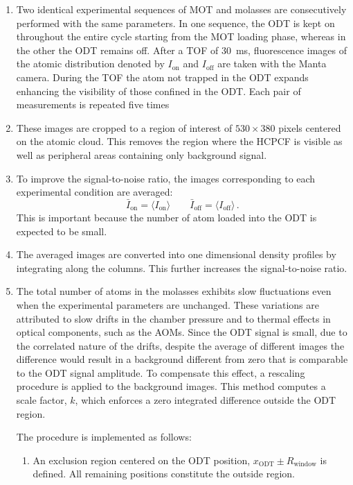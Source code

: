 \begin{enumerate}
    \item Two identical experimental sequences of MOT and molasses are consecutively performed with the same parameters. In one sequence, the ODT is kept on throughout the entire cycle starting from the MOT loading phase, whereas in the other the ODT remains off. After a TOF of 30~ms, fluorescence images of the atomic distribution denoted by $I_\text{on}$ and $I_\text{off}$ are taken with the Manta camera.
    During the TOF the atom not trapped in the ODT expands enhancing the visibility of those confined in the ODT. Each pair of measurements is repeated five times
    
    \item  These images are cropped to  a region of interest of $530 \times 380$ pixels centered on the atomic cloud. This removes the region where the HCPCF is visible as well as peripheral areas containing only background signal.
    
    \item To improve the signal-to-noise ratio, the images corresponding to each experimental condition are averaged:
    \begin{equation*}
        \bar{I}_\text{on} = \langle I_\text{on} \rangle \qquad \bar{I}_\text{off} = \langle I_\text{off} \rangle\,.
    \end{equation*}
    This is important because the number of atom loaded into the ODT is expected to be small.

    \item The averaged images are converted into one dimensional density profiles by integrating along the columns. This further increases the signal-to-noise ratio.
    
    \item The total number of atoms in the molasses exhibits slow fluctuations even when the experimental parameters are unchanged. These variations are attributed to slow drifts in the chamber pressure and to thermal effects in optical components, such as the AOMs. Since the ODT signal is small, due to the correlated nature of the drifts, despite the average of different images the difference would result in a background different from zero that is comparable to the  ODT signal amplitude. 
    To compensate this effect, a rescaling procedure is applied to the background images. This method computes a scale factor, $k$, which enforces a zero integrated difference outside the ODT region.
    
    The procedure is implemented as follows:
    \begin{enumerate}[label=\roman*.]
        \item An exclusion region centered on the ODT position, $x_{\text{ODT}} \pm R_{\text{window}}$ is defined. All remaining positions constitute the outside region.
        

\end{enumerate}
\end{enumerate}

